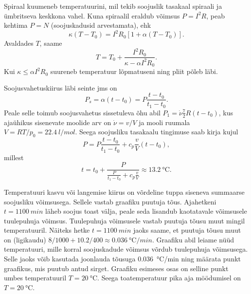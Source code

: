 \documentclass[10pt]{article}
\begin{document}
{%

\solu
Spiraal kuumeneb temperatuurini, mil tekib soojuslik tasakaal spiraali ja ümbritseva keskkona vahel. Kuna spiraalil eraldub võimsus $P = I^2R$, peab kehtima $P = N$ (soojuskadusid arvestamata), ehk
\[
\kappa\left(T-T_{0}\right)=I^{2} R_{0}\left[1+\alpha\left(T-T_{0}\right)\right].
\]
Avaldades $T$, saame
\[
T=T_{0}+\frac{I^{2} R_{0}}{\kappa-\alpha I^{2} R_{0}}.
\]
Kui $\kappa \leq \alpha I^2R_0$ suureneb temperatuur lõpmatuseni ning pliit põleb läbi.
\probend
\bigskip


\solu
Soojusvahetuskiirus läbi seinte jms on $$P_s=\alpha (t-t_0)=P\frac{t-t_0}{t_1-t_0}.$$
Peale selle toimub soojusvahetus sissetuleva õhu abil
$P_1=\dot\nu \frac 72 R (t-t_0)$, kus ajaühikus sisenevate moolide arv on $\dot\nu=v/V$ ja mooli ruumala $V=RT/p_0=\SI{22,4}{l/mol}$.
Seega soojusliku tasakaalu tingimuse saab kirja kujul
$$P= P\frac{t-t_0}{t_1-t_0} + c_p\frac vV(t-t_0),$$
millest $$t=t_0+\frac{P}{\frac{P}{t_1-t_0}+c_p\frac{v}{V}}
\approx \SI{13,2}{\degreeCelsius}.$$
\probend
\bigskip


\solu
Temperatuuri kasvu või langemise kiirus on võrdeline tuppa siseneva summaarse soojusliku võimsusega. Sellele vastab graafiku puutuja tõus. Ajahetkeni $t = \SI{1100}{min}$ läheb soojus toast välja, peale seda lisandub kaotatavale võimsusele tuulepuhuja võimsus. Tuulepuhuja võimsusele vastab puutuja tõusu muut mingil temperatuuril. Näiteks hetke $t = \SI{1100}{min}$ jaoks saame, et puutuja tõusu muut on (ligikaudu) $8/1000 + \num{10,2}/400 \approx \SI{0,036}{\degreeCelsius/min}$. Graafiku abil leiame nüüd temperatuuri, mille korral soojuskadude võimsus võrdub tuulepuhuja võimsusega. Selle jaoks võib kasutada joonlauda tõusuga \SI{0,036}{\degreeCelsius/min} ning määrata punkt graafikus, mis puutub antud sirget. Graafiku esimeses osas on selline punkt umbes temperatuuril $T = \SI{20}{\degreeCelsius}$. Seega toatemperatuur pika aja möödumisel on $T = \SI{20}{\degreeCelsius}$.
\probend
\bigskip


}
\end{document}
